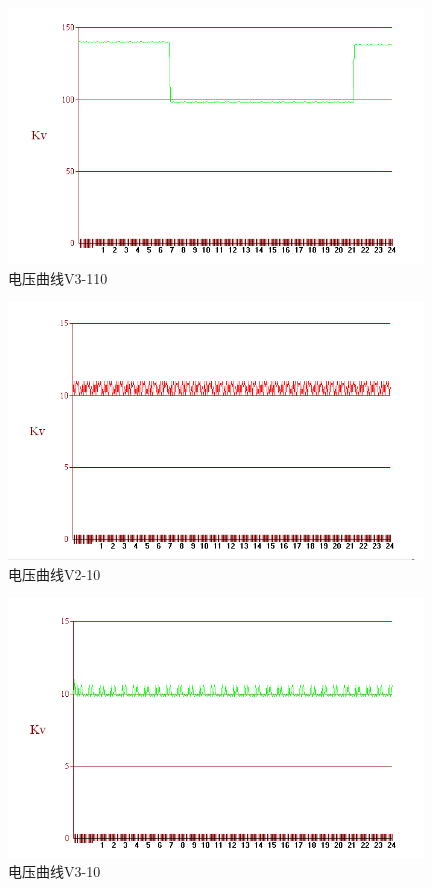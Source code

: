 \documentclass[a4paper]{ctexrep}
\begin{document}
                    \begin{figure}[htbp]
                        \centering
                        \includegraphics[width=11cm]{33.png} 
                        \caption{电压曲线V3-110}
                    \end{figure}

                    \begin{figure}[htbp]
                        \centering
                        \includegraphics[width=11cm]{34.png} 
                        \caption{电压曲线V2-10}
                    \end{figure}

                    \begin{figure}[htbp]
                        \centering
                        \includegraphics[width=11cm]{35.png} 
                        \caption{电压曲线V3-10}
                    \end{figure}
\end{document}
